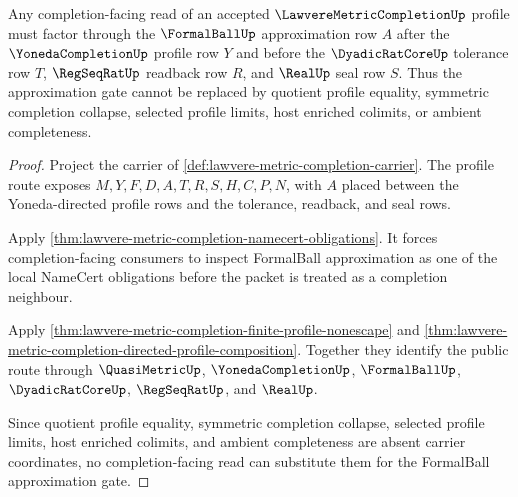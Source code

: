 \begin{theorem}
\label{thm:lawvere-metric-completion-formal-ball-universality-route}
Any completion-facing read of an accepted $\LawvereMetricCompletionUp$ profile
must factor through the $\FormalBallUp$ approximation row $A$ after the
$\YonedaCompletionUp$ profile row $Y$ and before the $\DyadicRatCoreUp$
tolerance row $T$, $\RegSeqRatUp$ readback row $R$, and $\RealUp$ seal row $S$.
Thus the approximation gate cannot be replaced by quotient profile equality,
symmetric completion collapse, selected profile limits, host enriched colimits,
or ambient completeness.
\end{theorem}
\begin{proof}
Project the carrier of \autoref{def:lawvere-metric-completion-carrier}. The
profile route exposes $M,Y,F,D,A,T,R,S,H,C,P,N$, with $A$ placed between the
Yoneda-directed profile rows and the tolerance, readback, and seal rows.

Apply \autoref{thm:lawvere-metric-completion-namecert-obligations}. It forces
completion-facing consumers to inspect FormalBall approximation as one of the
local NameCert obligations before the packet is treated as a completion
neighbour.

Apply \autoref{thm:lawvere-metric-completion-finite-profile-nonescape} and
\autoref{thm:lawvere-metric-completion-directed-profile-composition}. Together
they identify the public route through $\QuasiMetricUp$, $\YonedaCompletionUp$,
$\FormalBallUp$, $\DyadicRatCoreUp$, $\RegSeqRatUp$, and $\RealUp$.

Since quotient profile equality, symmetric completion collapse, selected
profile limits, host enriched colimits, and ambient completeness are absent
carrier coordinates, no completion-facing read can substitute them for the
FormalBall approximation gate.
\end{proof}

